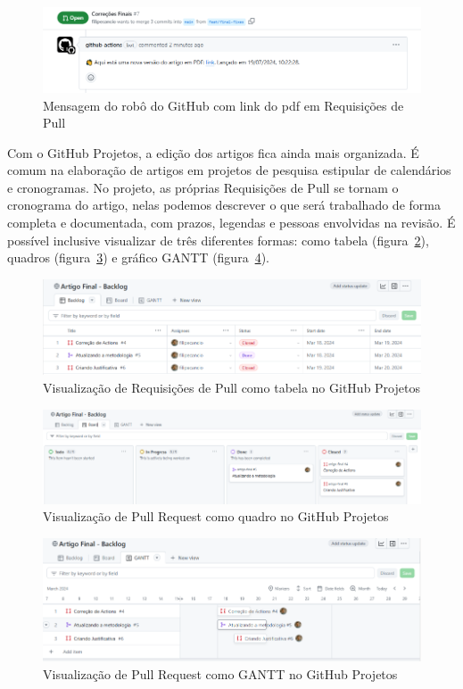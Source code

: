 \begin{figure}[H]
	\centering
	\includegraphics[width=.7\textwidth]{./images/fig06.png}
	\caption{Mensagem do robô do GitHub com link do pdf em Requisições de Pull}
	\label{fig:fig06}
\end{figure}

Com o GitHub Projetos, a edição dos artigos fica ainda mais organizada. É comum na elaboração de artigos em projetos de pesquisa estipular de calendários e cronogramas. No projeto, as próprias Requisições de Pull se tornam o cronograma do artigo, nelas podemos descrever o que será trabalhado de forma completa e documentada, com prazos, legendas e pessoas envolvidas na revisão. É possível inclusive visualizar de três diferentes formas: como tabela (figura~\ref{fig:fig07}), quadros (figura~\ref{fig:fig08}) e gráfico GANTT (figura~\ref{fig:fig09}).

\begin{figure}[H]
	\centering
	\includegraphics[width=.8\textwidth]{./images/fig07.png}
	\caption{Visualização de Requisições de Pull como tabela no GitHub Projetos}
	\label{fig:fig07}
\end{figure}

\begin{figure}[ht]
	\centering
	\includegraphics[width=.8\textwidth]{./images/fig08.png}
	\caption{Visualização de Pull Request como quadro no GitHub Projetos}
	\label{fig:fig08}
\end{figure}

\begin{figure}[ht]
	\centering
	\includegraphics[width=.8\textwidth]{./images/fig09.png}
	\caption{Visualização de Pull Request como GANTT no GitHub Projetos}
	\label{fig:fig09}
\end{figure}

